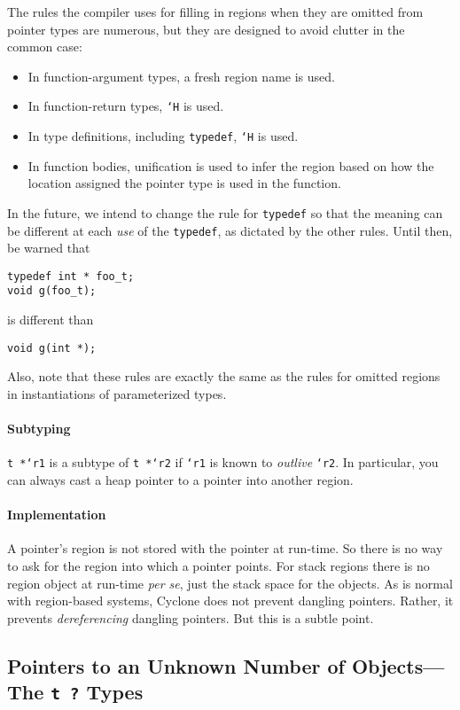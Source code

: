 The rules the compiler uses for filling in regions when they are
omitted from pointer types are numerous, but they are designed to
avoid clutter in the common case:
\begin{itemize}
\item In function-argument types, a fresh region name is used.
\item In function-return types, \texttt{`H} is used.
\item In type definitions, including \texttt{typedef}, \texttt{`H} is used.
\item In function bodies, unification is used to infer the region
based on how the location assigned the pointer type is used in the
function.
\end{itemize}
In the future, we intend to change the rule for \texttt{typedef} so
that the meaning can be different at each \emph{use} of the
\texttt{typedef}, as dictated by the other rules.  Until then, be
warned that 
\begin{verbatim}
typedef int * foo_t;
void g(foo_t);
\end{verbatim}
is different than
\begin{verbatim}
void g(int *);
\end{verbatim}
Also, note that these rules are exactly the same as the rules for
omitted regions in instantiations of parameterized types.

\paragraph{Subtyping} \texttt{t *`r1} is a subtype of \texttt{t *`r2}
if \texttt{`r1} is known to \emph{outlive} \texttt{`r2}.  In
particular, you can always cast a heap pointer to a pointer into
another region.

\paragraph{Implementation} A pointer's region is not stored with the
pointer at run-time.  So there is no way to ask for the region into
which a pointer points.  For stack regions there is no region object
at run-time \emph{per se}, just the stack space for the objects.  As
is normal with region-based systems, Cyclone does not prevent dangling
pointers.  Rather, it prevents \emph{dereferencing} dangling pointers.
But this is a subtle point.

\subsection*{\hypertarget{pointer_unknown}{Pointers to an Unknown
    Number of Objects---The \texttt{t ?} Types}}

